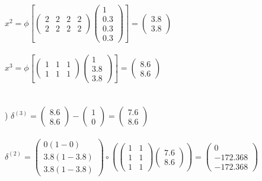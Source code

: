 \documentclass[12pt]{article}
\begin{document}
\indent $x^2 = \phi\left[
\begin{pmatrix}
2 & 2 & 2 & 2\\
2 & 2 & 2 & 2
\end{pmatrix}
\begin{pmatrix}
1\\ 0.3\\ 0.3 \\ 0.3
\end{pmatrix}\right]=
\begin{pmatrix}
3.8\\ 3.8
\end{pmatrix}$\\\\

\indent $x^3 = \phi\left[
\begin{pmatrix}
1 & 1 & 1\\
1 & 1 & 1
\end{pmatrix}
\begin{pmatrix}
1\\ 3.8\\ 3.8
\end{pmatrix}\right]=
\begin{pmatrix}
8.6 \\ 8.6
\end{pmatrix}$\\\\



\noindent \hrulefill \\



) $\delta^{(3)} = 
\begin{pmatrix}
8.6 \\ 8.6
\end{pmatrix} - 
\begin{pmatrix}
1 \\ 0
\end{pmatrix} = 
\begin{pmatrix}
7.6 \\ 8.6
\end{pmatrix}$\\\\

\indent $\delta^{(2)} = 
\begin{pmatrix}
0(1 - 0) \\ 3.8(1 - 3.8) \\ 3.8(1 - 3.8)
\end{pmatrix} \circ \left(
\begin{pmatrix}
1 & 1 \\
1 & 1 \\
1 & 1 
\end{pmatrix}
\begin{pmatrix}
7.6 \\ 8.6
\end{pmatrix} \right) = 
\begin{pmatrix}
0 \\ -172.368 \\ -172.368
\end{pmatrix}
$\\\\
\end{document}

